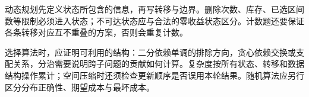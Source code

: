 动态规划先定义状态所包含的信息，再写转移与边界。删除次数、库存、已选区间数等限制必须进入状态；不可达状态应与合法的零收益状态区分。计数题还要保证各条转移对应互不重叠的方案，否则会重复计数。

选择算法时，应证明可利用的结构：二分依赖单调的排除方向，贪心依赖交换或支配关系，分治需要说明跨子问题的贡献如何计算。复杂度按所有状态、转移和数据结构操作累计；空间压缩时还须检查更新顺序是否误用本轮结果。随机算法应另行区分分布正确性、期望成本与最坏成本。
\par\smallskip
